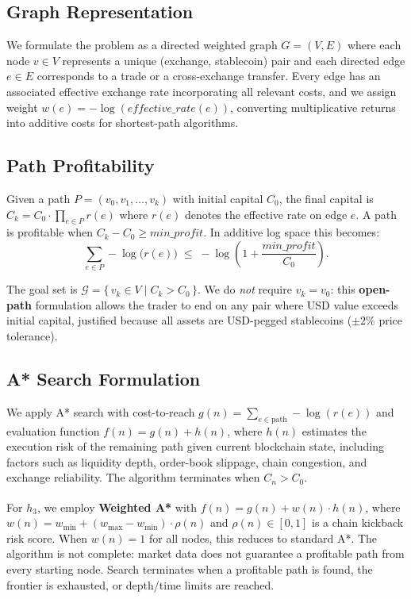 \subsection{Graph Representation}

We formulate the problem as a directed weighted graph $G=(V,E)$ where each node $v\in V$ represents a unique (exchange, stablecoin) pair and each directed edge $e\in E$ corresponds to a trade or a cross-exchange transfer. Every edge has an associated effective exchange rate incorporating all relevant costs, and we assign weight $w(e) = -\log(\textit{effective\_rate}(e))$, converting multiplicative returns into additive costs for shortest-path algorithms.

\subsection{Path Profitability}

Given a path $P=(v_0,v_1,\dots,v_k)$ with initial capital $C_0$, the final capital is
$C_k = C_0 \cdot \prod_{e\in P} r(e)$
where $r(e)$ denotes the effective rate on edge $e$. A path is profitable when $C_k - C_0 \ge \textit{min\_profit}$. In additive log space this becomes:
\[
\sum_{e\in P} -\log\!\big(r(e)\big)
\;\le\;
-\log\!\left(1+\frac{\textit{min\_profit}}{C_0}\right).
\]

The goal set is $\mathcal{G} = \bigl\{\, v_k \in V \;\big|\; C_k > C_0 \,\bigr\}$. We do \emph{not} require $v_k = v_0$: this \textbf{open-path} formulation allows the trader to end on any pair where USD value exceeds initial capital, justified because all assets are USD-pegged stablecoins ($\pm 2\%$ price tolerance).

\subsection{A* Search Formulation}

We apply A* search with cost-to-reach $g(n) = \sum_{e\in \text{path}} -\log(r(e))$ and evaluation function $f(n) = g(n) + h(n)$, where $h(n)$ estimates the execution risk of the remaining path given current blockchain state, including factors such as liquidity depth, order-book slippage, chain congestion, and exchange reliability. The algorithm terminates when $C_n > C_0$.

For $h_3$, we employ \textbf{Weighted A*}\textsuperscript{\cite{pohl1970weighted}} with $f(n) = g(n) + w(n) \cdot h(n)$, where $w(n) = w_{\min} + (w_{\max} - w_{\min}) \cdot \rho(n)$ and $\rho(n) \in [0,1]$ is a chain kickback risk score. When $w(n)=1$ for all nodes, this reduces to standard A*. The algorithm is not complete: market data does not guarantee a profitable path from every starting node. Search terminates when a profitable path is found, the frontier is exhausted, or depth/time limits are reached.
